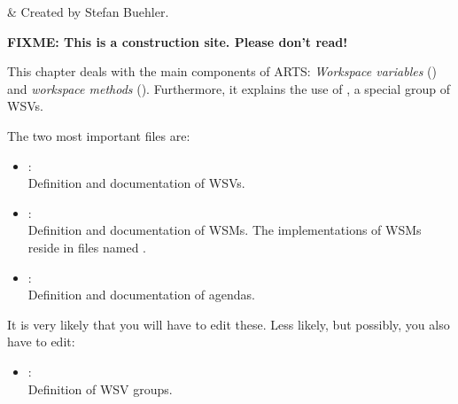 
\label{sec:agendas}

 & Created by Stefan Buehler.\\
\stophistory

{\Large \bf FIXME: This is a construction site. Please don't read!}

This chapter deals with the main components of ARTS: \emph{Workspace
  variables} () and
\emph{workspace methods} ().
Furthermore, it explains the use of , a special
group of WSVs.



\label{sec:agendas:files}

The two most important files are:
\begin{itemize}
\item {}:\\
  Definition and documentation of WSVs.
\item{}:\\
  Definition and documentation of WSMs. The
  implementations of WSMs reside in files named
  .
\item {}:\\
  Definition and documentation of agendas.
\end{itemize}
It is very likely that you will have to edit these. Less likely, but
possibly, you also have to edit:
\begin{itemize}
\item {}:\\
  Definition of WSV groups.
\end{itemize}

